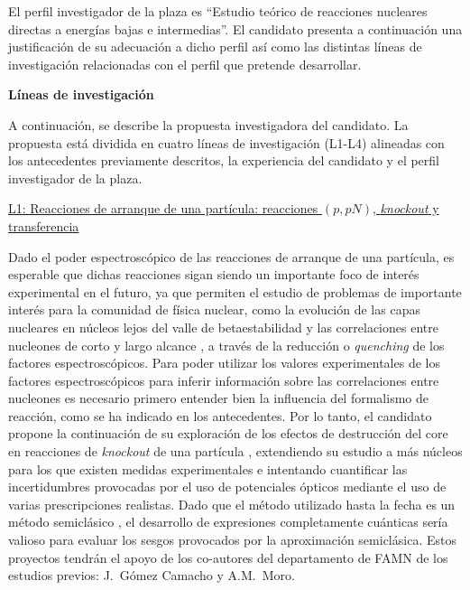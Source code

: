 \documentclass[a4paper,12pt,twoside]{article}
\begin{document}
El perfil investigador de la plaza es ``Estudio teórico de
reacciones nucleares directas a energías bajas e intermedias''. El candidato presenta a continuación una justificación de su adecuación a dicho perfil así como las distintas líneas de investigación relacionadas con el perfil que pretende desarrollar.

\textbf{Líneas de investigación}

A continuación, se describe la propuesta investigadora del candidato. La propuesta
está dividida en cuatro líneas de investigación (L1-L4) alineadas con los antecedentes previamente descritos, la experiencia del candidato y el perfil investigador de la
plaza.

\underline{L1: Reacciones de arranque de una partícula: reacciones $(p,pN)$, \textit{knockout} y transferencia}

Dado el poder espectroscópico de las reacciones de arranque de una partícula, es esperable que dichas reacciones sigan siendo un importante foco de interés experimental en el futuro, ya que permiten el estudio de problemas de importante interés para la comunidad de física nuclear, como la evolución de las capas nucleares en núcleos lejos del valle de betaestabilidad y las correlaciones entre nucleones de corto y largo alcance \cite{nupecc}, a través de la reducción o \textit{quenching} de los factores espectroscópicos. Para poder utilizar los valores experimentales de los factores espectroscópicos para inferir información sobre las correlaciones entre nucleones es necesario primero entender bien la influencia del formalismo de reacción, como se ha indicado en los antecedentes. Por lo tanto, el candidato propone la continuación de su exploración de los efectos de destrucción del core en reacciones de \textit{knockout} de una partícula \cite{quenching}, extendiendo su estudio a más núcleos para los que existen medidas experimentales \cite{Tos21} e intentando cuantificar las incertidumbres provocadas por el uso de potenciales ópticos mediante el uso de varias prescripciones realistas. Dado que el método utilizado hasta la fecha es un método semiclásico \cite{quenching}, el desarrollo de expresiones completamente cuánticas sería valioso para evaluar los sesgos provocados por la aproximación semiclásica. Estos proyectos tendrán el apoyo de los co-autores del departamento de FAMN de los estudios previos: J.~Gómez Camacho y A.M.~Moro.
\end{document}

